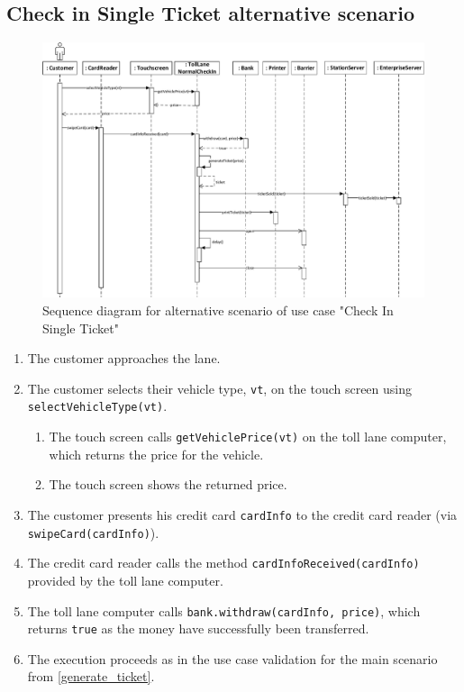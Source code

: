 \subsection{Check in Single Ticket alternative scenario}

\begin{figure}[H]
\centerline{\includegraphics[width=1.4\columnwidth]{"img/sequence_diagrams/sequence_diagram_single_ticket_check_in_card"}}
\caption{Sequence diagram for alternative scenario of use case "Check In Single Ticket"}
\label{fig:seq_single_ticket_alt}
\end{figure}

\begin{enumerate}
\item The customer approaches the lane.
\item The customer selects their vehicle type, \texttt{vt}, on the touch screen using \texttt{selectVehicleType(vt)}.
	\begin{enumerate}
	\item The touch screen calls \texttt{getVehiclePrice(vt)} on the toll lane computer, which returns the price for the vehicle.
	\item The touch screen shows the returned price.
	\end{enumerate}
\item The customer presents his credit card \texttt{cardInfo} to the credit card reader (via \texttt{swipeCard(cardInfo)}).
	\item The credit card reader calls the method \texttt{cardInfoReceived(cardInfo)} provided by the toll lane computer.
		\item The toll lane computer calls \texttt{bank.withdraw(cardInfo, price)}, which returns \texttt{true} as the money have successfully been transferred.
		\item The execution proceeds as in the use case validation for the main scenario from \autoref{generate_ticket}.
		
	
\end{enumerate}